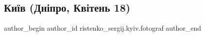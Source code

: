  
 
 
 
 

\subsection{Київ (Дніпро, Квітень 18)}
\label{sec:18_04_2023.fb.ristenko_sergij.kyiv.fotograf.1.kyiv_dnipro_kviten_18}

\ifcmt
 author_begin
   author_id ristenko_sergij.kyiv.fotograf
 author_end
\fi
